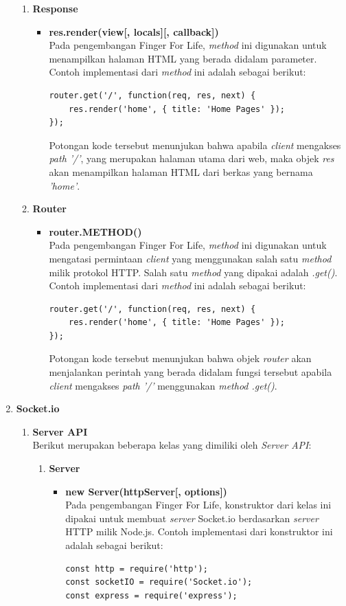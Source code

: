 \begin{enumerate}
\begin{enumerate}
		\item \textbf{Response} \\
		\begin{itemize}
			\item \textbf{res.render(view[, locals][, callback])} \\
			Pada pengembangan Finger For Life, \textit{method} ini digunakan untuk menampilkan halaman HTML yang berada didalam parameter. Contoh implementasi dari \textit{method} ini adalah sebagai berikut:
\begin{lstlisting}
router.get('/', function(req, res, next) {
	res.render('home', { title: 'Home Pages' });
});
\end{lstlisting}
			Potongan kode tersebut menunjukan bahwa apabila \textit{client} mengakses \textit{path '/'}, yang merupakan halaman utama dari web, maka objek \textit{res} akan menampilkan halaman HTML dari berkas yang bernama \textit{'home'}.
		\end{itemize}
	
		\item \textbf{Router} \\
		\begin{itemize}
			\item \textbf{router.METHOD()} \\
			Pada pengembangan Finger For Life, \textit{method} ini digunakan untuk mengatasi permintaan \textit{client} yang menggunakan salah satu \textit{method} milik protokol HTTP. Salah satu \textit{method} yang dipakai adalah \textit{.get()}. Contoh implementasi dari \textit{method} ini adalah sebagai berikut:
\begin{lstlisting}
router.get('/', function(req, res, next) {
	res.render('home', { title: 'Home Pages' });
});
\end{lstlisting}
			Potongan kode tersebut menunjukan bahwa objek \textit{router} akan menjalankan perintah yang berada didalam fungsi tersebut apabila \textit{client} mengakses \textit{path '/'} menggunakan \textit{method .get()}.
		\end{itemize}
	\end{enumerate}
	
	\item \textbf{Socket.io}
	\begin{enumerate}
		\item \textbf{Server API} \\
		Berikut merupakan beberapa kelas yang dimiliki oleh \textit{Server API}:
		\begin{enumerate}
			\item \textbf{Server}
			\begin{itemize}
				\item \textbf{new Server(httpServer[, options])} \\
				Pada pengembangan Finger For Life, konstruktor dari kelas ini dipakai untuk membuat \textit{server} Socket.io berdasarkan \textit{server} HTTP milik Node.js. Contoh implementasi dari konstruktor ini adalah sebagai berikut:
\begin{lstlisting}
const http = require('http');
const socketIO = require('Socket.io');
const express = require('express');


\end{lstlisting}
\end{itemize}
\end{enumerate}
\end{enumerate}
\end{enumerate}
